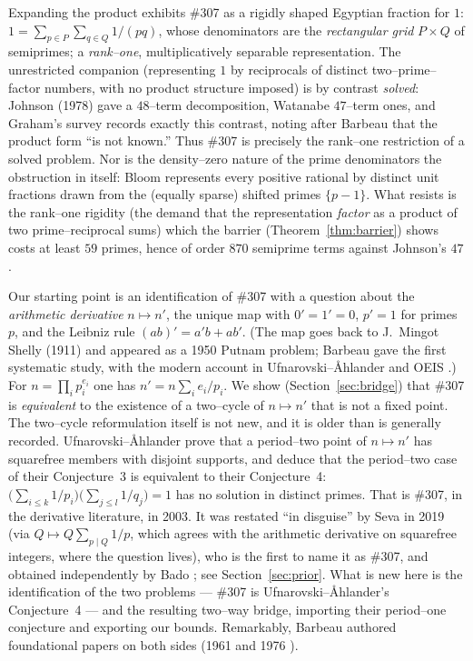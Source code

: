 \documentclass[11pt]{article}
\theoremstyle{definition}
\begin{document}
Expanding the product exhibits \#307 as a rigidly shaped Egyptian fraction for $1$:
$1=\sum_{p\in P}\sum_{q\in Q}1/(pq)$, whose denominators are the \emph{rectangular grid} $P\times Q$
of semiprimes; a \emph{rank--one}, multiplicatively separable representation. The unrestricted
companion (representing $1$ by reciprocals of distinct two--prime--factor numbers, with no product
structure imposed) is by contrast \emph{solved}: Johnson (1978) gave a $48$--term decomposition,
Watanabe \cite{Watanabe2020} $47$--term ones, and Graham's survey \cite{GrahamEgyptian} records exactly
this contrast, noting after Barbeau that the product form ``is not known.'' Thus \#307 is precisely the
rank--one restriction of a solved problem. Nor is the density--zero nature of the prime denominators the
obstruction in itself: Bloom \cite{BloomShifted} represents every positive rational by distinct unit
fractions drawn from the (equally sparse) shifted primes $\{p-1\}$. What resists is the rank--one
rigidity (the demand that the representation \emph{factor} as a product of two prime--reciprocal
sums) which the barrier (Theorem~\ref{thm:barrier}) shows costs at least $59$ primes, hence of order
$870$ semiprime terms against Johnson's $47$.

Our starting point is an identification of \#307 with a question about the \emph{arithmetic
derivative} $n\mapsto n'$, the unique map with $0'=1'=0$, $p'=1$ for primes $p$, and the Leibniz
rule $(ab)'=a'b+ab'$. (The map goes back to J.~Mingot Shelly (1911) and appeared as a 1950 Putnam
problem; Barbeau \cite{Barbeau1961} gave the first systematic study, with the modern account in
Ufnarovski--\AA hlander \cite{UfnarovskiAhlander2003} and OEIS \cite{OEIS_A003415}.) For
$n=\prod_i p_i^{e_i}$ one has $n'=n\sum_i e_i/p_i$. We show (Section~\ref{sec:bridge}) that \#307
is \emph{equivalent} to the existence of a two--cycle of $n\mapsto n'$ that is not a fixed point.
The two--cycle reformulation itself is not new, and it is older than is generally recorded.
Ufnarovski--\AA hlander \cite{UfnarovskiAhlander2003} prove that a period--two point of $n\mapsto n'$
has squarefree members with disjoint supports, and deduce that the period--two case of their
Conjecture~3 is equivalent to their Conjecture~4: $\bigl(\sum_{i\le k}1/p_i\bigr)
\bigl(\sum_{j\le l}1/q_j\bigr)=1$ has no solution in distinct primes. That is \#307, in the
derivative literature, in 2003. It was restated ``in disguise'' by Seva \cite{Seva323194} in 2019
(via $Q\mapsto Q\sum_{p\mid Q}1/p$, which agrees with the arithmetic derivative on squarefree
integers, where the question lives), who is the first to name it as \#307, and obtained
independently by Bado \cite{Bado2026}; see Section~\ref{sec:prior}. What is new here is the
identification of the two problems --- \#307 is Ufnarovski--\AA hlander's Conjecture~4 --- and the
resulting two--way bridge, importing their period--one conjecture and exporting our bounds.
Remarkably, Barbeau authored foundational papers on both sides (1961 and 1976
\cite{Barbeau1961,Barbeau1976}).
\end{document}

